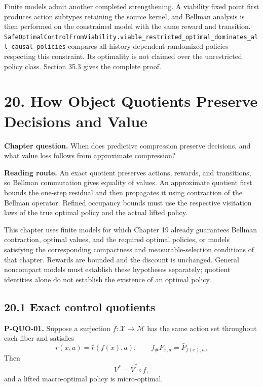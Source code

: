 \documentclass[
  english,
  11pt,
  oneside]{book}
\begin{document}
Finite models admit another completed strengthening. A viability fixed point first produces action subtypes retaining the source kernel, and Bellman analysis is then performed on the constrained model with the same reward and transition. \nolinkurl{SafeOptimalControlFromViability.viable_restricted_optimal_dominates_all_causal_policies} compares all history-dependent randomized policies respecting this constraint. Its optimality is not claimed over the unrestricted policy class. Section 35.3 gives the complete proof.

\chapter{20. How Object Quotients Preserve Decisions and Value}\label{ch-20}

\textbf{Chapter question.} When does predictive compression preserve decisions, and what value loss follows from approximate compression?

\textbf{Reading route.} An exact quotient preserves actions, rewards, and transitions, so Bellman commutation gives equality of values. An approximate quotient first bounds the one-step residual and then propagates it using contraction of the Bellman operator. Refined occupancy bounds must use the respective visitation laws of the true optimal policy and the actual lifted policy.

This chapter uses finite models for which Chapter 19 already guarantees Bellman contraction, optimal values, and the required optimal policies, or models satisfying the corresponding compactness and measurable-selection conditions of that chapter. Rewards are bounded and the discount is unchanged. General noncompact models must establish these hypotheses separately; quotient identities alone do not establish the existence of an optimal policy.

\section{20.1 Exact control quotients}\label{exact-control-quotients}

\hypertarget{p-quo-01}{}\label{p-quo-01}

\textbf{P-QUO-01.} Suppose a surjection \(f:\mathcal X\to\mathcal M\) has the same action set throughout each fiber and satisfies \[r(x,a)=\bar r(f(x),a),\qquad
f_\#P_{x,a}=\bar P_{f(x),a},\] Then \[V^*=\bar V^*\circ f,\] and a lifted macro-optimal policy is micro-optimal.
\end{document}
